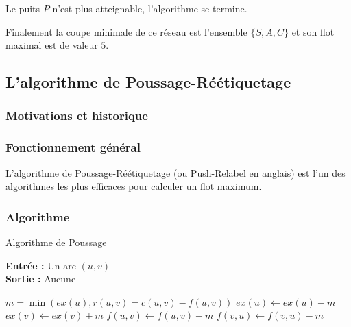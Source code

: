 \documentclass[a4paper]{article}
\begin{document}
	\begin{center}
	\end{center}
Le puits $P$ n'est plus atteignable, l'algorithme se termine.

Finalement la coupe minimale de ce réseau est l'ensemble $\{S,A,C\}$ et son flot maximal est de valeur $5$.

\subsection{L'algorithme de Poussage-Réétiquetage}

\subsubsection{Motivations et historique}

\subsubsection{Fonctionnement général}
L'algorithme de Poussage-Réétiquetage (ou Push-Relabel en anglais) est l'un des algorithmes les plus efficaces pour calculer un flot maximum. \\

\subsubsection{Algorithme}
\begin{algorithm}[H]
	\caption{Algorithme de Poussage}
	\textbf{Entrée :} Un arc $(u,v)$ \\
	\textbf{Sortie :} Aucune
	\begin{algorithmic}[1]
		\State $m = \min(ex(u), r(u,v)=c(u,v)-f(u,v))$
		\State $ex(u) \gets ex(u) - m$
		\State $ex(v) \gets ex(v) + m$
		\State $f(u,v) \gets f(u,v) + m$
		\State $f(v,u) \gets f(v,u) - m$
	\end{algorithmic}
\end{algorithm}
\end{document}
